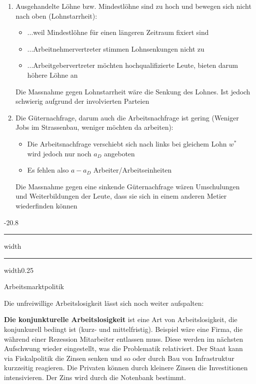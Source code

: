 \documentclass[9pt, landscape, fleqn]{scrartcl}
\makeatletter
\renewcommand{\subsection}{\@startsection{subsection}{1}{0mm}%
{-2\baselineskip}{0.8\baselineskip}%
{\hrule depth 0.2pt width\columnwidth\hrule depth0.75pt
width0.25\columnwidth\vspace*{1.2em}\large\bfseries\rmfamily}}
\makeatother
\begin{document}
\begin{multicols*}{3}
\begin{enumerate}
    \item Ausgehandelte Löhne bzw. Mindestlöhne sind zu hoch und bewegen sich nicht nach oben (Lohnstarrheit):
    \begin{itemize}
        \item ...weil Mindestlöhne für einen längeren Zeitraum fixiert sind
        \item ...Arbeitnehmervertreter stimmen Lohnsenkungen nicht zu 
        \item ...Arbeitgebervertreter möchten hochqualifizierte Leute, bieten darum höhere Löhne an 
    \end{itemize}
    Die Massnahme gegen Lohnstarrheit wäre die Senkung des Lohnes. Ist jedoch schwierig aufgrund der involvierten Parteien 
    \item Die Güternachfrage, darum auch die Arbeitsnachfrage ist gering (Weniger Jobs im Strassenbau, weniger möchten da arbeiten):
    \begin{itemize}
        \item Die Arbeitsnachfrage verschiebt sich nach links bei gleichem Lohn $w^*$ wird jedoch nur noch $a_D$ angeboten
        \item Es fehlen also $a-a_D$ Arbeiter/Arbeitseinheiten 
    \end{itemize}
    Die Massnahme gegen eine sinkende Güternachfrage wären Umschulungen und Weiterbildungen der Leute, dass sie sich in einem anderen Metier wiederfinden können
\end{enumerate}

\subsection{Arbeitsmarktpolitik}

Die unfreiwillige Arbeitslosigkeit lässt sich noch weiter aufspalten: \newline

\textbf{Die konjunkturelle Arbeitslosigkeit} ist eine Art von Arbeitslosigkeit, die konjunkurell bedingt ist (kurz- und mittelfristig). Beispiel wäre eine Firma, die während einer Rezession Mitarbeiter entlassen muss. Diese werden im nächsten Aufschwung wieder eingestellt, was die Problematik relativiert. Der Staat kann via Fiskalpolitik die Zinsen senken und so oder durch Bau von Infrastruktur kurzzeitig reagieren. Die Privaten können durch kleinere Zinsen die Investitionen intensivieren. Der Zins wird durch die Notenbank bestimmt. \newline 


\end{multicols*}
\end{document}
